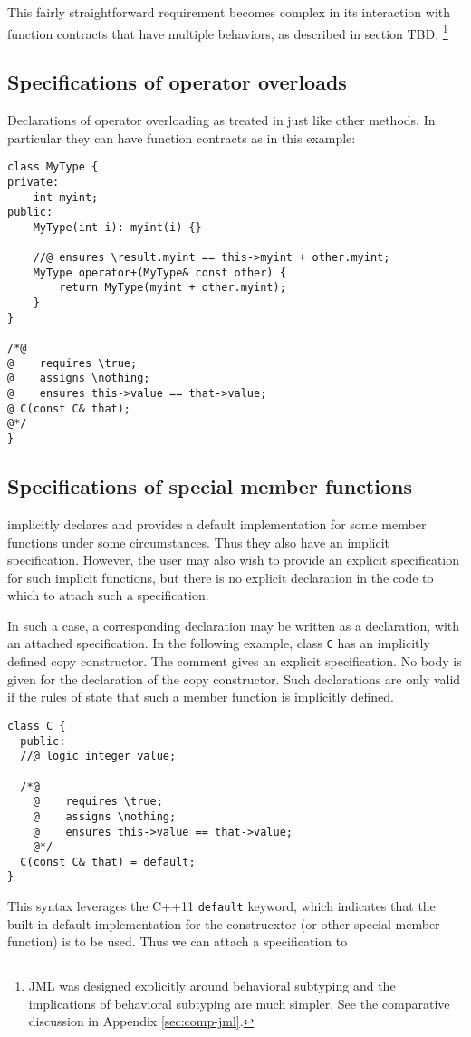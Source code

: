 This fairly straightforward requirement becomes complex in its interaction with function contracts that have multiple behaviors, 
as described in section TBD.
\footnote{JML was designed explicitly around behavioral subtyping and the implications of behavioral subtyping are much simpler. 
	See the comparative discussion in Appendix \ref{sec:comp-jml}.}


\subsection{Specifications of operator overloads}
Declarations of operator overloading as treated in \NAME just like other
methods. In particular they can have function contracts as in this example:
\begin{lstlisting}
class MyType {
private:
    int myint;
public:
    MyType(int i): myint(i) {}

    //@ ensures \result.myint == this->myint + other.myint;
    MyType operator+(MyType& const other) {
        return MyType(myint + other.myint);
    }
}

/*@
@    requires \true;
@    assigns \nothing;
@    ensures this->value == that->value;
@ C(const C& that);
@*/
}
\end{lstlisting}
\subsection{Specifications of special member functions}

\lang implicitly declares and provides a default implementation for some member functions under some circumstances. 
Thus they also have an implicit specification. However, the user may also wish to provide an explicit specification for such implicit functions, but there is no
explicit declaration in the \lang code to which to attach such a 
specification.

In such a case, a corresponding declaration may be written as a \NAME 
declaration, with an attached specification. 
In the following example, class \lstinline|C| has an implicitly defined
copy constructor. The \NAME comment gives an explicit specification.
No body is given for the declaration of the \lang copy constructor.
Such declarations are only valid if the rules of \lang state that such
a member function is implicitly defined.
\begin{lstlisting}
class C {
  public:
  //@ logic integer value;
  
  /*@
    @    requires \true;
    @    assigns \nothing;
    @    ensures this->value == that->value;
    @*/
  C(const C& that) = default;
}
\end{lstlisting}
This syntax leverages the C++11 \lstinline|default| keyword, which indicates that the built-in default implementation for the construcxtor (or other special member function) is to be used. Thus we can attach a specification to 

